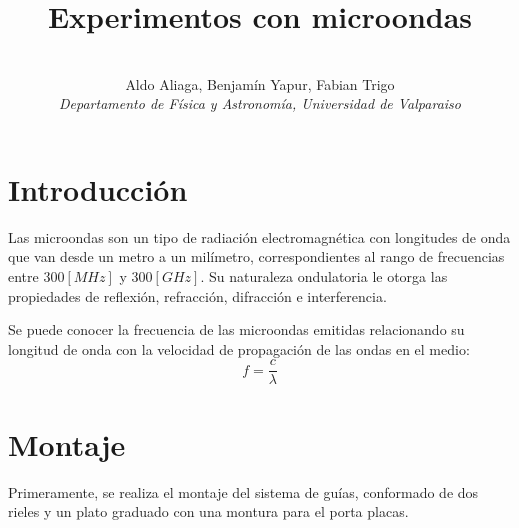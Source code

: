 \documentclass[a4paper,twocolumn,10pt]{article}
\begin{document}
\title{Experimentos con microondas}
\author{ \\Aldo Aliaga, Benjamín Yapur, Fabian Trigo \\ \textit{Departamento de Física y Astronomía, Universidad de Valparaiso}}

\vspace{2cm}

\section{Introducción}

Las microondas son un tipo de radiación electromagnética con longitudes de onda que van desde un metro a un milímetro, correspondientes al rango de frecuencias entre $300[MHz]$ y $300[GHz]$. Su naturaleza ondulatoria le otorga las propiedades de reflexión, refracción, difracción e interferencia. 

Se puede conocer la frecuencia de las microondas emitidas relacionando su longitud de onda con la velocidad de propagación de las ondas en el medio:
\begin{equation}
    f=\frac{c}{\lambda}
\end{equation}


\section{Montaje}

Primeramente, se realiza el montaje del sistema de guías, conformado de dos rieles y un plato graduado con una montura para el porta placas.
\end{document}
